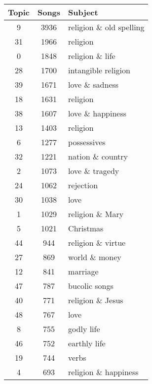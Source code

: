 \begin{table}
	\begin{minipage}{0.5\textwidth}
		\begin{tabular}{ccl}
			\toprule
			Topic & Songs & Subject \\
			\midrule
			9              &            3936 & religion \& old spelling \\
			31             &            1966 & religion \\
			0              &            1848 & religion \& life \\
			28             &            1700 & intangible religion \\
			39             &            1671 & love \& sadness \\
			18             &            1631 & religion \\
			38             &            1607 & love \& happiness \\
			13             &            1403 & religion \\
			6              &            1277 & possessives \\
			32             &            1221 & nation \& country \\
			2              &            1073 & love \& tragedy \\
			24             &            1062 & rejection \\
			30             &            1038 & love \\
			1              &            1029 & religion \& Mary \\
			5              &            1021 & Christmas \\
			44             &             944 & religion \& virtue \\
			27             &             869 & world \& money \\
			12             &             841 & marriage \\
			47             &             787 & bucolic songs \\
			40             &             771 & religion \& Jesus \\
			48             &             767 & love \\
			8              &             755 & godly life \\
			46             &             752 & earthly life \\
			19             &             744 & verbs \\
			4              &             693 & religion \& happiness \\

\end{tabular}
\end{minipage}
\end{table}
